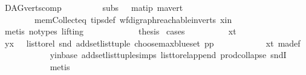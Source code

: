 \begin{isabellebody}
\ DAG{\isachardot}{\kern0pt}verts{\isacharunderscore}{\kern0pt}comp{}\ \isanewline
\ \ \ \ \ \ \ \ subs\ {}\ \ ma{\isacharunderscore}{\kern0pt}tip\ ma{\isacharunderscore}{\kern0pt}vert\ \isanewline
\ \ \ \ \ \ \ \ mem{\isacharunderscore}{\kern0pt}Collect{\isacharunderscore}{\kern0pt}eq\ tips{\isacharunderscore}{\kern0pt}def\ wf{\isacharunderscore}{\kern0pt}digraph{\isachardot}{\kern0pt}reachable{}{\isacharunderscore}{\kern0pt}in{\isacharunderscore}{\kern0pt}verts{\isacharparenleft}{\kern0pt}{}{\isacharparenright}{\kern0pt}\ x{\isacharunderscore}{\kern0pt}in\isanewline
\ \ \ \ \ \ \ \ \ \ \isamarkupfalse%
\ {\isacharparenleft}{\kern0pt}metis\ {\isacharparenleft}{\kern0pt}no{\isacharunderscore}{\kern0pt}types{\isacharcomma}{\kern0pt}\ lifting{\isacharparenright}{\kern0pt}{\isacharparenright}{\kern0pt}\ \isanewline
\ \ \ \ \ \ \ \ \isamarkupfalse%
\ \isamarkupfalse%
\ {\isacharquery}{\kern0pt}thesis\ \isamarkupfalse%
{\isacharparenleft}{\kern0pt}cases{\isacharparenright}{\kern0pt}\isanewline
\ \ \ \ \ \ \ \ \isamarkupfalse%
\ x{\isacharunderscore}{\kern0pt}t\isanewline
\ \ \ \ \ \ \ \ \isamarkupfalse%
\ \isamarkupfalse%
\ {\isachardoublequoteopen}{\isacharparenleft}{\kern0pt}y{\isacharcomma}{\kern0pt}x{\isacharparenright}{\kern0pt}\ {\isasymin}\ \ list{\isacharunderscore}{\kern0pt}to{\isacharunderscore}{\kern0pt}rel\ {\isacharparenleft}{\kern0pt}snd\ {\isacharparenleft}{\kern0pt}add{\isacharunderscore}{\kern0pt}set{\isacharunderscore}{\kern0pt}list{\isacharunderscore}{\kern0pt}tuple\ {\isacharparenleft}{\kern0pt}choose{\isacharunderscore}{\kern0pt}max{\isacharunderscore}{\kern0pt}blue{\isacharunderscore}{\kern0pt}set\ pp{\isacharparenright}{\kern0pt}{\isacharparenright}{\kern0pt}{\isacharparenright}{\kern0pt}{\isachardoublequoteclose}\isanewline
\ \ \ \ \ \ \ \ \ \ \isamarkupfalse%
\ x{\isacharunderscore}{\kern0pt}t\ ma{\isacharunderscore}{\kern0pt}def\ \isanewline
\ \ \ \ \ \ \ \ \ \ \isamarkupfalse%
\ y{\isacharunderscore}{\kern0pt}in{\isacharunderscore}{\kern0pt}base\ add{\isacharunderscore}{\kern0pt}set{\isacharunderscore}{\kern0pt}list{\isacharunderscore}{\kern0pt}tuple{\isachardot}{\kern0pt}simps\ list{\isacharunderscore}{\kern0pt}to{\isacharunderscore}{\kern0pt}rel{\isacharunderscore}{\kern0pt}append\ prod{\isachardot}{\kern0pt}collapse\ sndI\isanewline
\ \ \ \ \ \ \ \ \ \ \isamarkupfalse%
\ metis\isanewline
\ \ \ \ \ \ \ \ \isamarkupfalse%

\end{isabellebody}
